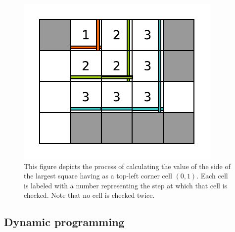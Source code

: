 \begin{figure}
	\centering
	\label{fig:square_in_matrix:square_matrix_diagonal}
	\includegraphics[]{sources/square_in_matrix/images/square_matrix_diagonal}
	\caption[Square in matrix - Brute-force diagonal]{This figure depicts the process of calculating the value of the side of the largest square having as a top-left corner cell $(0,1)$. Each cell is labeled with a number representing the step at which that cell is checked. Note that no cell is checked twice.}
\end{figure}





\subsection{Dynamic programming}
